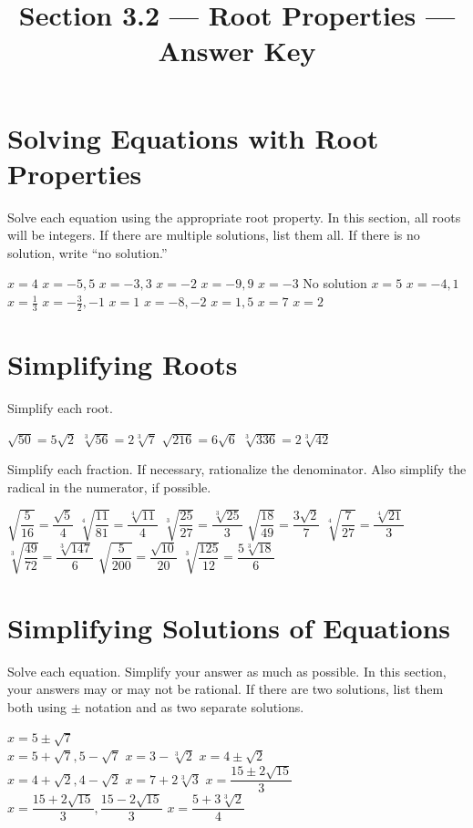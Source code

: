 

\title{Section 3.2 --- Root Properties --- Answer Key}


\maketitle
\section*{Solving Equations with Root Properties}
Solve each equation using the appropriate root property. In this section, all roots will be integers. If there are multiple solutions, list them all. If there is no solution, write ``no solution.''
\begin{smenum}
\mitemxxxx
{$x=4$}
{$x=-5,5$}
{$x=-3,3$}
{$x=-2$}
\mitemxxxx
{$x=-9,9$}
{$x=-3$}
{No solution}
{$x=5$}
\mitemxxxx
{$x=-4,1$}
{$x=\frac{1}{3}$}
{$x=-\frac{3}{2},-1$}
{$x=1$}
\mitemxxxx
{$x=-8,-2$}
{$x=1,5$}
{$x=7$}
{$x=2$}
\end{smenum}
\section*{Simplifying Roots}
Simplify each root.
\begin{smenum}
\mitemxxxx
{$\sqrt{50}=5\sqrt{2}$}
{$\sqrt[3]{56}=2\sqrt[3]{7}$}
{$\sqrt{216}=6\sqrt{6}$}
{$\sqrt[3]{336}=2\sqrt[3]{42}$}
\end{smenum}
Simplify each fraction. If necessary, rationalize the denominator. Also simplify the radical in the numerator, if possible.
\begin{smenum}
\mitemxxxx
{$\sqrt{\dfrac{5}{16}}=\dfrac{\sqrt{5}}{4}$}
{$\sqrt[4]{\dfrac{11}{81}}=\dfrac{\sqrt[4]{11}}{4}$}
{$\sqrt[3]{\dfrac{25}{27}}=\dfrac{\sqrt[3]{25}}{3}$}
{$\sqrt{\dfrac{18}{49}}=\dfrac{3\sqrt{2}}{7}$}
\mitemxxxx
{$\sqrt[4]{\dfrac{7}{27}}=\dfrac{\sqrt[4]{21}}{3}$}
{$\sqrt[3]{\dfrac{49}{72}}=\dfrac{\sqrt[3]{147}}{6}$}
{$\sqrt{\dfrac{5}{200}}=\dfrac{\sqrt{10}}{20}$}
{$\sqrt[3]{\dfrac{125}{12}}=\dfrac{5\sqrt[3]{18}}{6}$}
\end{smenum}
\section*{Simplifying Solutions of Equations}
Solve each equation. Simplify your answer as much as possible. In this section, your answers may or may not be rational. If there are two solutions, list them both using $\pm$ notation and as two separate solutions.
\begin{smenum}
\mitemxxx
{$x=5\pm\sqrt{7}$\\$x=5+\sqrt{7},5-\sqrt{7}$}
{$x=3-\sqrt[3]{2}$}
{$x=4\pm\sqrt{2}$\\$x=4+\sqrt{2},4-\sqrt{2}$}
\mitemxxx
{$x=7+2\sqrt[3]{3}$}
{$x=\dfrac{15\pm 2\sqrt{15}}{3}$\\$x=\dfrac{15+2\sqrt{15}}{3},\dfrac{15-2\sqrt{15}}{3}$}
{$x=\dfrac{5+3\sqrt[3]{2}}{4}$}
\end{smenum}

